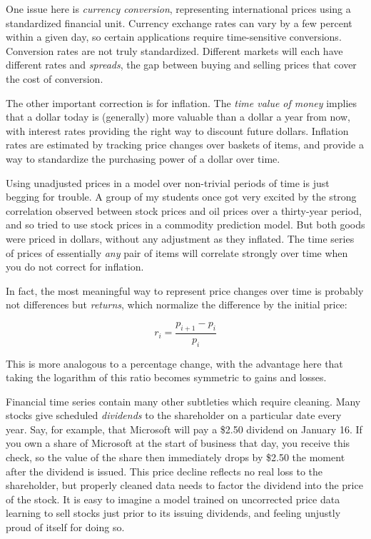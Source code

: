 \documentclass[10pt]{article}
\begin{document}
One issue here is \emph{currency conversion}, representing international prices using a standardized financial unit. Currency exchange rates can vary by a few percent within a given day, so certain applications require time-sensitive conversions. Conversion rates are not truly standardized. Different markets will each have different rates and \emph{spreads}, the gap between buying and selling prices that cover the cost of conversion.

The other important correction is for inflation. The \emph{time value of money} implies that a dollar today is (generally) more valuable than a dollar a year from now, with interest rates providing the right way to discount future dollars. Inflation rates are estimated by tracking price changes over baskets of items, and provide a way to standardize the purchasing power of a dollar over time.

Using unadjusted prices in a model over non-trivial periods of time is just begging for trouble. A group of my students once got very excited by the strong correlation observed between stock prices and oil prices over a thirty-year period, and so tried to use stock prices in a commodity prediction model. But both goods were priced in dollars, without any adjustment as they inflated. The time series of prices of essentially \emph{any} pair of items will correlate strongly over time when you do not correct for inflation.

In fact, the most meaningful way to represent price changes over time is probably not differences but \emph{returns}, which normalize the difference by the initial price:

\begin{equation}
r_{i} = \frac{p_{i+1}-p_{i}}{p_{i}}
\end{equation}

This is more analogous to a percentage change, with the advantage here that taking the logarithm of this ratio becomes symmetric to gains and losses.

Financial time series contain many other subtleties which require cleaning. Many stocks give scheduled \emph{dividends} to the shareholder on a particular date every year. Say, for example, that Microsoft will pay a \$2.50 dividend on January 16. If you own a share of Microsoft at the start of business that day, you receive this check, so the value of the share then immediately drops by \$2.50 the moment after the dividend is issued. This price decline reflects no real loss to the shareholder, but properly cleaned data needs to factor the dividend into the price of the stock. It is easy to imagine a model trained on uncorrected price data learning to sell stocks just prior to its issuing dividends, and feeling unjustly proud of itself for doing so.
\end{document}
